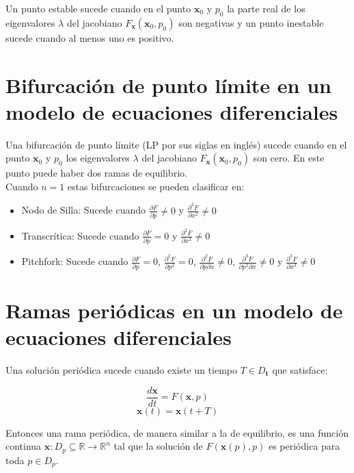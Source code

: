 \documentclass[10pt,a4paper]{article}
\begin{document}
Un punto estable sucede cuando en el punto \( \mathbf{x}_{0} \) y \( p_{0} \) la parte real de los eigenvalores \( \lambda \) del jacobiano \( F_{\mathbf{x}}(\mathbf{x}_{0}, p_{0}) \) son negativas y un punto inestable sucede cuando al menos uno es positivo.

\section{Bifurcación de punto límite en un modelo de ecuaciones diferenciales}

Una bifurcación de punto límite (LP por sus siglas en inglés) sucede cuando en el punto \( \mathbf{x}_{0} \) y \( p_{0} \) los eigenvalores \( \lambda \) del jacobiano \( F_{\mathbf{x}}(\mathbf{x}_{0}, p_{0}) \) son cero. En este punto puede haber dos ramas de equilibrio.\\

Cuando \( n = 1 \) estas bifurcaciones se pueden clasificar \cite{McCann} en:

\begin{itemize}
    \item Nodo de Silla: Sucede cuando \( \frac{\partial F}{\partial p} \neq 0 \) y \( \frac{\partial^{2} F}{\partial x^{2}} \neq 0 \)
    \item Transcrítica: Sucede cuando \( \frac{\partial F}{\partial p} = 0 \) y \( \frac{\partial^{2} F}{\partial x^{2}} \neq 0 \)
    \item Pitchfork: Sucede cuando \( \frac{\partial F}{\partial p} = 0 \), \( \frac{\partial^{2} F}{\partial p^{2}} = 0 \), \( \frac{\partial^{2} F}{\partial p \partial x} \neq 0 \), \( \frac{\partial^{3} F}{\partial p^{2} \partial x} \neq 0 \) y \( \frac{\partial^{3} F}{\partial x^{3}} \neq 0 \)
\end{itemize}

\section{Ramas periódicas en un modelo de ecuaciones diferenciales}

Una solución periódica sucede cuando existe un tiempo \( T \in D_{\mathbf{t}} \) que satisface:

\[
\dfrac{d\mathbf{x}}{dt} = F(\mathbf{x}, p)
\]
\[
\mathbf{x}(t) = \mathbf{x}(t + T)
\]

Entonces una rama periódica, de manera similar a la de equilibrio, es una función continua \( \mathbf{x}: D_{p} \subseteq \mathbb{R} \rightarrow \mathbb{R}^{n} \) tal que la solución de \( F(\mathbf{x}(p), p) \) es periódica para toda \( p \in D_{p} \).
\end{document}
